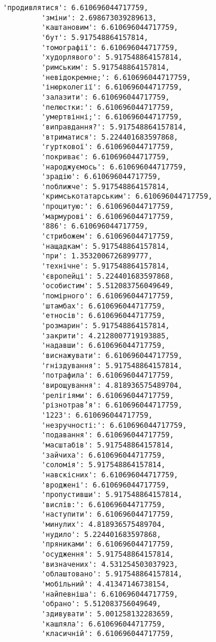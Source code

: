 \documentclass[11pt]{article}
\begin{document}
\begin{Verbatim}[commandchars=\\\{\}]
         'продивлятися': 6.610696044717759,
         'зміни': 2.698673039289613,
         'каштановим': 6.610696044717759,
         'бут': 5.917548864157814,
         'томографії': 6.610696044717759,
         'худорлявого': 5.917548864157814,
         'римським': 5.917548864157814,
         'невідокремне;': 6.610696044717759,
         'інюрколегії': 6.610696044717759,
         'залазити': 6.610696044717759,
         'пелюстки:': 6.610696044717759,
         'умертвінні;': 6.610696044717759,
         'виправдання?': 5.917548864157814,
         'втриматися': 5.224401683597868,
         'гурткової': 6.610696044717759,
         'покриває': 6.610696044717759,
         'народжуємось': 6.610696044717759,
         'зрадію': 6.610696044717759,
         'поближче': 5.917548864157814,
         'кримськотатарським': 6.610696044717759,
         'процитую:': 6.610696044717759,
         'мармурові': 6.610696044717759,
         '886': 6.610696044717759,
         'стрибожем': 6.610696044717759,
         'нащадкам': 5.917548864157814,
         'при': 1.3532006726899777,
         'технічне': 5.917548864157814,
         'європейці': 5.224401683597868,
         'особистим': 5.512083756049649,
         'помірного': 6.610696044717759,
         'штамбах': 6.610696044717759,
         'етносів': 6.610696044717759,
         'розмарин': 5.917548864157814,
         'закрити': 4.2128007719193885,
         'надавши': 6.610696044717759,
         'виснажувати': 6.610696044717759,
         'гніздування': 5.917548864157814,
         'потрафила': 6.610696044717759,
         'вирощування': 4.818936575489704,
         'релігіями': 6.610696044717759,
         'різнотрав’я': 6.610696044717759,
         '1223': 6.610696044717759,
         'незручності:': 6.610696044717759,
         'подавання': 6.610696044717759,
         'масштабів': 5.917548864157814,
         'зайчиха': 6.610696044717759,
         'соломія': 5.917548864157814,
         'навскісних': 6.610696044717759,
         'вроджені': 6.610696044717759,
         'пропустивши': 5.917548864157814,
         'вислів:': 6.610696044717759,
         'наступити': 6.610696044717759,
         'минулих': 4.818936575489704,
         'нудило': 5.224401683597868,
         'пряниками': 6.610696044717759,
         'осудження': 5.917548864157814,
         'визначених': 4.531254503037923,
         'облаштовано': 5.917548864157814,
         'мобільний': 4.41347146738154,
         'найпевніша': 6.610696044717759,
         'обрано': 5.512083756049649,
         'здивувати': 5.001258132283659,
         'кашляла': 6.610696044717759,
         'класичній': 6.610696044717759,

\end{Verbatim}
\end{document}
